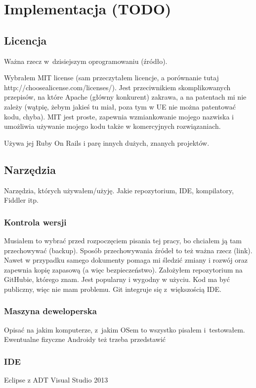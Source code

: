 \chapter{Implementacja (TODO)}

\section{Licencja}
Ważna rzecz w~dzisiejszym oprogramowaniu (źródło).

Wybrałem MIT license (sam przeczytałem licencje, a porównanie tutaj http://choosealicense.com/licenses/). Jest przeciwnikiem skomplikowanych przepisów, na które Apache (główny konkurent) zakrawa, a na patentach mi nie zależy (wątpię, żebym jakieś tu miał, poza tym w UE nie można patentować kodu, chyba). MIT jest proste, zapewnia wzmiankowanie mojego nazwiska i umożliwia używanie mojego kodu także w komercyjnych rozwiązaniach.

Używa jej Ruby On Rails i parę innych dużych, znanych projektów.


\section{Narzędzia}
Narzędzia, których używałem/użyję. Jakie repozytorium, IDE, kompilatory, Fiddler itp.

\subsection{Kontrola wersji}
Musiałem to wybrać przed rozpoczęciem pisania tej pracy, bo chciałem ją tam przechowywać (backup). Sposób przechowywania źródeł to też ważna rzecz (link).
Nawet w przypadku samego dokumenty pomaga mi śledzić zmiany i rozwój oraz zapewnia kopię zapasową (a więc bezpieczeństwo).
Założyłem repozytorium na GitHubie, którego znam. Jest popularny i wygodny w użyciu. Kod ma być publiczny, więc nie mam problemu.
Git integruje się z~większością IDE.


\subsection{Maszyna deweloperska}
Opisać na jakim komputerze, z~jakim OSem to wszystko pisałem i~testowałem.
Ewentualne fizyczne Androidy też trzeba przedstawić


\subsection{IDE}
Eclipse z ADT
Visual Studio 2013


